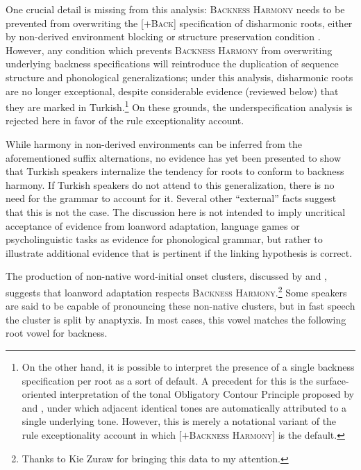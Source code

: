 One crucial detail is missing from this analysis: \textsc{Backness Harmony} needs to be prevented from overwriting the [$+$\textsc{Back}] specification of disharmonic roots, either by non-derived environment blocking \citep{Mascaro1976} or structure preservation condition \citep{Kiparsky1985}. However, any condition which prevents \textsc{Backness Harmony} from overwriting underlying backness specifications will reintroduce the duplication of sequence structure and phonological generalizations; under this analysis, disharmonic roots are no longer exceptional, despite considerable evidence (reviewed below) that they are marked in Turkish.\footnote{On the other hand, it is possible to interpret the presence of a single backness specification per root as a sort of default. A precedent for this is the surface-oriented interpretation of the tonal Obligatory Contour Principle proposed by \citet[134]{Goldsmith1976} and \citet{Odden1986}, under which adjacent identical tones are automatically attributed to a single underlying tone. However, this is merely a notational variant of the rule exceptionality account in which [$+$\textsc{Backness Harmony}] is the default.} On these grounds, the underspecification analysis is rejected here in favor of the rule exceptionality account.  

While harmony in non-derived environments can be inferred from the aforementioned suffix alternations, no evidence has yet been presented to show that Turkish speakers internalize the tendency for roots to conform to backness harmony. If Turkish speakers do not attend to this generalization, there is no need for the grammar to account for it. Several other ``external'' facts suggest that this is not the case. The discussion here is not intended to imply uncritical acceptance of evidence from loanword adaptation, language games or psycholinguistic tasks as evidence for phonological grammar, but rather to illustrate additional evidence that is pertinent if the linking hypothesis is correct.

The production of non-native word-initial onset clusters, discussed by \citet{Clements1982} and \citet{Kaun1999}, suggests that loanword adaptation respects \textsc{Backness Harmony}.\footnote{Thanks to Kie Zuraw for bringing this data to my attention.} Some speakers are said to be capable of pronouncing these non-native clusters, but in fast speech the cluster is split by anaptyxis. In most cases, this vowel matches the following root vowel for backness.

